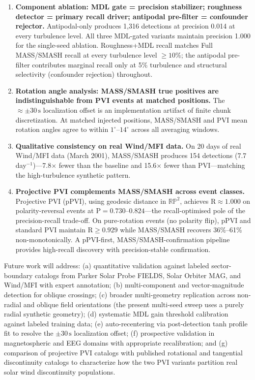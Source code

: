\documentclass[12pt,letterpaper]{article}
\newcommand{\secunit}{\,\mathrm{s}}
\newcommand{\pPVI}{\mathrm{pPVI}}
\begin{document}
\begin{enumerate}
\item \textbf{Component ablation: MDL gate = precision stabilizer;
roughness detector = primary recall driver; antipodal pre-filter =
confounder rejector.}
Antipodal-only produces 1,316 detections at precision 0.014 at every
turbulence level.
All three MDL-gated variants maintain precision 1.000 for the single-seed
ablation.
Roughness+MDL recall matches Full MASS/SMASH recall at every turbulence
level $\geq 10\%$; the antipodal pre-filter contributes marginal recall only
at 5\% turbulence and structural selectivity (confounder rejection) throughout.

\item \textbf{Rotation angle analysis: MASS/SMASH true positives are
indistinguishable from PVI events at matched positions.}
The $\approx \pm 30\secunit$ localization offset is an implementation artifact
of finite chunk discretization.
At matched injected positions, MASS/SMASH and PVI mean rotation angles agree
to within $1^\circ$--$14^\circ$ across all averaging windows.

\item \textbf{Qualitative consistency on real Wind/MFI data.}
On 20 days of real Wind/MFI data (March 2001), MASS/SMASH produces
154 detections (7.7 day$^{-1}$)---7.8$\times$ fewer than the baseline and
15.6$\times$ fewer than PVI---matching the high-turbulence synthetic pattern.

\item \textbf{Projective PVI complements MASS/SMASH across event classes.}
Projective PVI ($\pPVI$), using geodesic distance in $\mathbb{RP}^2$, achieves
$\mathrm{R} \approx 1.000$ on polarity-reversal events at
$\mathrm{P} = 0.730$--$0.824$---the recall-optimised pole of the
precision-recall trade-off.
On pure-rotation events (no polarity flip), $\pPVI$ and standard PVI maintain
$\mathrm{R} \geq 0.929$ while MASS/SMASH recovers 36\%--61\% non-monotonically.
A $\pPVI$-first, MASS/SMASH-confirmation pipeline provides high-recall
discovery with precision-stable confirmation.

\end{enumerate}

Future work will address: (a) quantitative validation against labeled
sector-boundary catalogs from Parker Solar Probe FIELDS, Solar Orbiter MAG,
and Wind/MFI with expert annotation; (b) multi-component and vector-magnitude
detection for oblique crossings; (c) broader multi-geometry replication across
non-radial and oblique field orientations (the present multi-seed sweep uses
a purely radial synthetic geometry); (d) systematic MDL gain threshold
calibration against labeled training data; (e) auto-recentering via
post-detection tanh profile fit to resolve the $\pm 30\secunit$ localization
offset; (f) prospective validation in magnetospheric and EEG domains with
appropriate recalibration; and (g) comparison of projective PVI catalogs with
published rotational and tangential discontinuity catalogs to characterize how
the two PVI variants partition real solar wind discontinuity populations.
\end{document}

